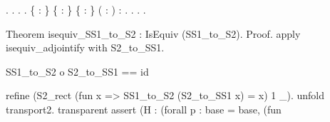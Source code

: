 \begin{coqdoccode}
\coqdocindent{1.00em}
\coqdocnotation{(}  \coqdocnotation{)\^{}} \coqdocnotation{=} \coqdocnotation{\^{}}  \coqdocnotation{\^{}}.\coqdoceol
\coqdocnoindent
{}.  . .\coqdoceol
\coqdocemptyline
\coqdocnoindent
{}  \{ : \} \{  : \} \{  :  \coqdocnotation{=} \} ( :  \coqdocnotation{=} ) : \coqdoceol
\coqdocindent{1.00em}
  \coqdocnotation{=} \coqdocnotation{(}   \coqdocnotation{)}   .\coqdoceol
\coqdocnoindent
{}.  . .\coqdoceol
\coqdocemptyline
\coqdocnoindent
\begin{coqdoccomment}
\coqdoceol
Theorem\coqdocindent{0.50em}
isequiv\_SS1\_to\_S2\coqdocindent{0.50em}
:\coqdocindent{0.50em}
IsEquiv\coqdocindent{0.50em}
(SS1\_to\_S2).\coqdoceol
Proof.\coqdoceol
\coqdocindent{1.00em}
apply\coqdocindent{0.50em}
isequiv\_adjointify\coqdocindent{0.50em}
with\coqdocindent{0.50em}
S2\_to\_SS1.\coqdoceol
\coqdocindent{1.00em}
\coqdoceol
\coqdocindent{1.00em}
\begin{coqdoccomment}
\coqdocindent{0.50em}
SS1\_to\_S2\coqdocindent{0.50em}
o\coqdocindent{0.50em}
S2\_to\_SS1\coqdocindent{0.50em}
==\coqdocindent{0.50em}
id\coqdocindent{0.50em}
\end{coqdoccomment}
\coqdoceol
\coqdocindent{1.00em}
refine\coqdocindent{0.50em}
(S2\_rect\coqdocindent{0.50em}
(fun\coqdocindent{0.50em}
x\coqdocindent{0.50em}
=>\coqdocindent{0.50em}
SS1\_to\_S2\coqdocindent{0.50em}
(S2\_to\_SS1\coqdocindent{0.50em}
x)\coqdocindent{0.50em}
=\coqdocindent{0.50em}
x)\coqdocindent{0.50em}
1\coqdocindent{0.50em}
\_).\coqdoceol
\coqdocindent{1.00em}
unfold\coqdocindent{0.50em}
transport2.\coqdoceol
\coqdocindent{1.00em}
transparent\coqdocindent{0.50em}
assert\coqdocindent{0.50em}
(H\coqdocindent{0.50em}
:\coqdocindent{0.50em}
(forall\coqdocindent{0.50em}
p\coqdocindent{0.50em}
:\coqdocindent{0.50em}
base\coqdocindent{0.50em}
=\coqdocindent{0.50em}
base,\coqdoceol
\coqdocindent{3.00em}
(fun\coqdocindent{0.50em}

\end{coqdoccomment}
\end{coqdoccode}

